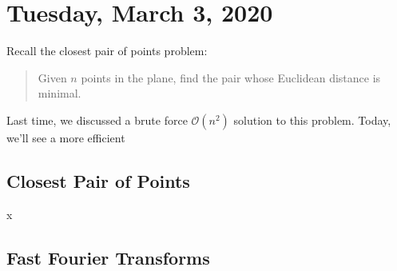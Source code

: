 \newpage
\section{Tuesday, March 3, 2020}

Recall the closest pair of points problem:

\begin{quote}
    Given $n$ points in the plane, find the pair whose Euclidean distance is minimal.
\end{quote}

Last time, we discussed a brute force $\mathcal{O}(n^2)$ solution to this problem. Today, we'll see a more efficient 

\subsection{Closest Pair of Points}
x

\subsection{Fast Fourier Transforms}

